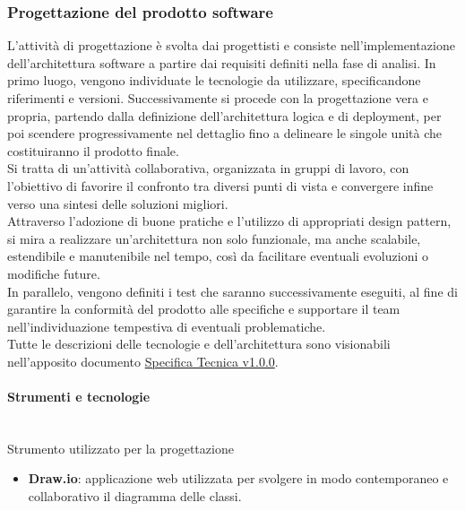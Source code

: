 \documentclass[a4paper,12pt]{article}
\begin{document}
{{        \subsubsection{Progettazione del prodotto software}
            L'attività di progettazione è svolta dai progettisti e consiste nell'implementazione dell'architettura software a partire dai requisiti definiti nella fase di analisi. In primo luogo, vengono individuate le tecnologie da utilizzare, specificandone riferimenti e versioni. Successivamente si procede con la progettazione vera e propria, partendo dalla definizione dell'architettura logica e di deployment, per poi scendere progressivamente nel dettaglio fino a delineare le singole unità che costituiranno il prodotto finale.
            \\
            Si tratta di un'attività collaborativa, organizzata in gruppi di lavoro, con l'obiettivo di favorire il confronto tra diversi punti di vista e convergere infine verso una sintesi delle soluzioni migliori.\\
            Attraverso l'adozione di buone pratiche e l'utilizzo di appropriati design pattern, si mira a realizzare un'architettura non solo funzionale, ma anche scalabile, estendibile e manutenibile nel tempo, così da facilitare eventuali evoluzioni o modifiche future.\\
            In parallelo, vengono definiti i test che saranno successivamente eseguiti, al fine di garantire la conformità del prodotto alle specifiche e supportare il team nell'individuazione tempestiva di eventuali problematiche.
            \\
            Tutte le descrizioni delle tecnologie e dell'architettura sono visionabili nell'apposito documento \href{https://atlasteam9.github.io/Atlas/docs/PB/documenti/esterni/Specifica%20Tecnica.pdf}{Specifica Tecnica v1.0.0}.

            \paragraph{Strumenti e tecnologie}\mbox{}\\
                Strumento utilizzato per la progettazione
                \begin{itemize}
                    \item \textbf{Draw.io}: applicazione web utilizzata per svolgere in modo contemporaneo e collaborativo il diagramma delle classi.
                \end{itemize}
            
}}
\end{document}
